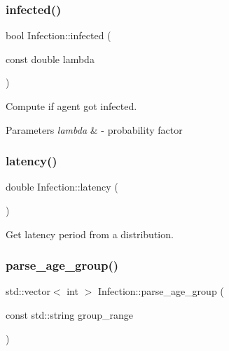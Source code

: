 \subsubsection{\texorpdfstring{infected()}{infected()}}
{\footnotesize\ttfamily bool Infection\+::infected (\begin{DoxyParamCaption}\item[{const double}]{lambda }\end{DoxyParamCaption})}



Compute if agent got infected. 


\begin{DoxyParams}{Parameters}
{\em lambda} & -\/ probability factor \\
\hline
\end{DoxyParams}
\mbox{\label{classInfection_a12eea482720563e31b6af703c5a19e6d}} 
\subsubsection{\texorpdfstring{latency()}{latency()}}
{\footnotesize\ttfamily double Infection\+::latency (\begin{DoxyParamCaption}{ }\end{DoxyParamCaption})}



Get latency period from a distribution. 

\mbox{\label{classInfection_aff2f19e5e147904023c0f7597f09c6ed}} 
\subsubsection{\texorpdfstring{parse\+\_\+age\+\_\+group()}{parse\_age\_group()}}
{\footnotesize\ttfamily std\+::vector$<$ int $>$ Infection\+::parse\+\_\+age\+\_\+group (\begin{DoxyParamCaption}\item[{const std\+::string}]{group\+\_\+range }\end{DoxyParamCaption})\hspace{0.3cm}{\ttfamily [protected]}}

\mbox{\label{classInfection_a706afb6867ac7e8ed917087363e30b30}} 
